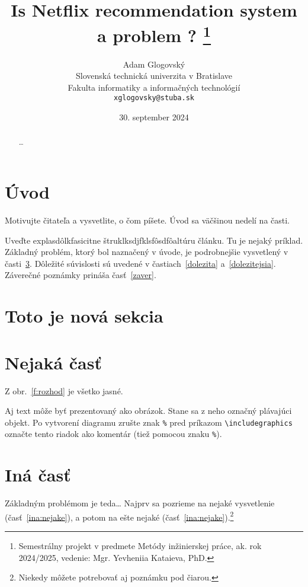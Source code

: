 \documentclass[10pt,twoside,slovak,a4paper]{coursepaper}
\title{Is Netflix recommendation system a problem ? \thanks{Semestrálny projekt v predmete Metódy inžinierskej práce, ak. rok 2024/2025, vedenie: Mgr. Yevheniia Kataieva, PhD.}} %
\author{Adam Glogovský\\[2pt]
	{\small Slovenská technická univerzita v Bratislave}\\
	{\small Fakulta informatiky a informačných technológií}\\
	{\small \texttt{xglogovsky@stuba.sk}}
	}
\date{\small 30. september 2024} %
\begin{document}
\maketitle

\begin{abstract}
	\ldots
\end{abstract}



\section{Úvod}

Motivujte čitateľa a vysvetlite, o čom píšete. Úvod sa väčšinou nedelí na časti.

Uveďte explasdôlkfasicitne štruklksdjfklsfôsdfôaltúru článku. Tu je nejaký príklad.
Základný problém, ktorý bol naznačený v úvode, je podrobnejšie vysvetlený v časti~\ref{nejaka}.
Dôležité súvislosti sú uvedené v častiach~\ref{dolezita} a~\ref{dolezitejsia}.
Záverečné poznámky prináša časť~\ref{zaver}.

\section{Toto je nová sekcia} \label{pouziva sa pre referencie}


\section{Nejaká časť} \label{nejaka}

Z obr.~\ref{f:rozhod} je všetko jasné.

\begin{figure*}[tbh]
	\centering
	Aj text môže byť prezentovaný ako obrázok. Stane sa z neho označný plávajúci objekt. Po vytvorení diagramu zrušte znak \texttt{\%} pred príkazom \verb|\includegraphics| označte tento riadok ako komentár (tiež pomocou znaku \texttt{\%}).
	\caption{Rozhodujúci argument.}
	\label{f:rozhod}
\end{figure*}



\section{Iná časť} \label{ina}

Základným problémom je teda\ldots{} Najprv sa pozrieme na nejaké vysvetlenie (časť~\ref{ina:nejake}), a potom na ešte nejaké (časť~\ref{ina:nejake}).\footnote{Niekedy môžete potrebovať aj poznámku pod čiarou.}
\end{document}

